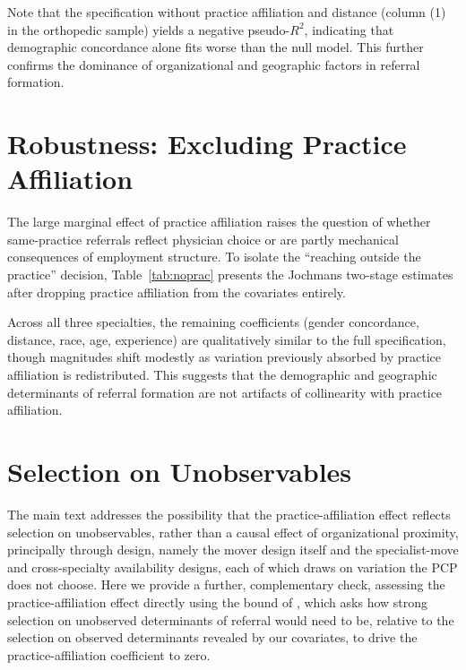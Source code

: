 \documentclass[12pt]{article}
\begin{document}
Note that the specification without practice affiliation and distance (column (1) in the orthopedic sample) yields a negative pseudo-$R^2$, indicating that demographic concordance alone fits worse than the null model. This further confirms the dominance of organizational and geographic factors in referral formation.


\section{Robustness: Excluding Practice Affiliation}
\label{sec:noprac}

The large marginal effect of practice affiliation raises the question of whether same-practice referrals reflect physician choice or are partly mechanical consequences of employment structure. To isolate the ``reaching outside the practice'' decision, Table~\ref{tab:noprac} presents the Jochmans two-stage estimates after dropping practice affiliation from the covariates entirely.

Across all three specialties, the remaining coefficients (gender concordance, distance, race, age, experience) are qualitatively similar to the full specification, though magnitudes shift modestly as variation previously absorbed by practice affiliation is redistributed. This suggests that the demographic and geographic determinants of referral formation are not artifacts of collinearity with practice affiliation.


\section{Selection on Unobservables}
\label{sec:oster}

The main text addresses the possibility that the practice-affiliation effect reflects selection on unobservables, rather than a causal effect of organizational proximity, principally through design, namely the mover design itself and the specialist-move and cross-specialty availability designs, each of which draws on variation the PCP does not choose. Here we provide a further, complementary check, assessing the practice-affiliation effect directly using the bound of \citet{oster2019}, which asks how strong selection on unobserved determinants of referral would need to be, relative to the selection on observed determinants revealed by our covariates, to drive the practice-affiliation coefficient to zero.
\end{document}
